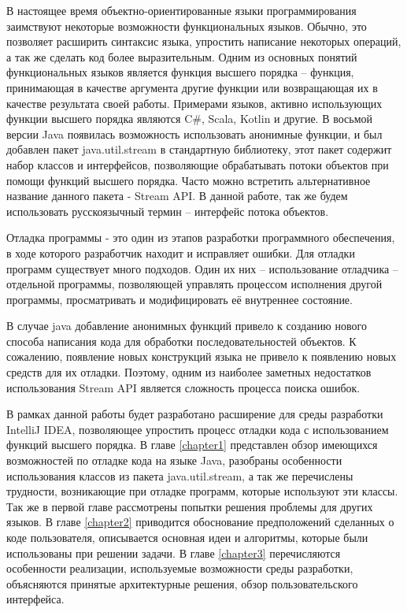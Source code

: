 В настоящее время объектно-ориентированные языки программирования заимствуют некоторые возможности функциональных языков.  Обычно, это позволяет расширить синтаксис языка, упростить написание некоторых операций, а так же сделать код более выразительным. Одним из основных понятий функциональных языков является функция высшего порядка -- функция, принимающая в качестве аргумента другие функции или возвращающая их в качестве результата своей работы. Примерами языков, активно использующих функции высшего порядка являются C\#, Scala, Kotlin и другие. В восьмой версии Java появилась возможность использовать анонимные функции, и был добавлен пакет java.util.stream в стандартную библиотеку, этот пакет содержит набор классов и интерфейсов, позволяющие обрабатывать потоки объектов при помощи функций высшего порядка. Часто можно встретить альтернативное название данного пакета - Stream API. В данной работе, так же будем использовать русскоязычный термин -- интерфейс потока объектов.

Отладка программы - это один из этапов разработки программного обеспечения, в ходе которого разработчик находит и исправляет ошибки. Для отладки программ существует много подходов. Один их них -- использование отладчика -- отдельной программы, позволяющей управлять процессом исполнения другой программы, просматривать и модифицировать её внутреннее состояние.

В случае java добавление анонимных функций привело к созданию нового способа написания кода для обработки последовательностей объектов. К сожалению, появление новых конструкций языка не привело к появлению новых средств для их отладки. Поэтому, одним из наиболее заметных недостатков использования Stream API является сложность процесса поиска ошибок.

В рамках данной работы будет разработано расширение для среды разработки IntelliJ IDEA, позволяющее упростить процесс отладки кода с использованием функций высшего порядка. В главе \ref{chapter1} представлен обзор имеющихся возможностей по отладке кода на языке Java, разобраны особенности использования классов из пакета java.util.stream, а так же перечислены трудности, возникающие при отладке программ, которые используют эти классы. Так же в первой главе рассмотрены попытки решения проблемы для других языков. В главе \ref{chapter2} приводится обоснование предположений сделанных о коде пользователя, описывается основная идеи и алгоритмы, которые были использованы при решении задачи. В главе \ref{chapter3} перечисляются особенности реализации, используемые возможности среды разработки, объясняются принятые архитектурные решения, обзор пользовательского интерфейса.

